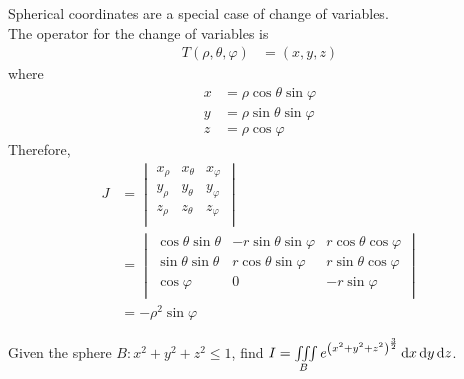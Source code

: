 \documentclass[fleqn, a4paper, 8pt, twoside]{amsart}
\theoremstyle{definition}
\theoremstyle{bluedefinition}
\theoremstyle{redtheorem}
\begin{document}
\begin{multicols}{2}
\begin{spacing}{0.7}
Spherical coordinates are a special case of change of variables.\\
The operator for the change of variables is
\begin{align*}
	T(\rho,\theta,\varphi) & = (x,y,z)
\end{align*}
where
\begin{align*}
	x & = \rho \cos \theta \sin \varphi \\
	y & = \rho \sin \theta \sin \varphi \\
	z & = \rho \cos \varphi
\end{align*}
Therefore,
\begin{align*}
	J &=
		\begin{vmatrix}
			x_{\rho} & x_{\theta} & x_{\varphi} \\
			y_{\rho} & y_{\theta} & y_{\varphi} \\
			z_{\rho} & z_{\theta} & z_{\varphi} \\
		\end{vmatrix}\\
	  &=
		\begin{vmatrix}
			\cos \theta \sin \theta & -r \sin \theta \sin \varphi & r \cos \theta \cos \varphi \\
			\sin \theta \sin \theta & r \cos \theta \sin \varphi  & r \sin \theta \cos \varphi \\
			\cos \varphi            & 0                           & -r \sin \varphi            \\
		\end{vmatrix}\\
	  &= -\rho^2 \sin \varphi
\end{align*}

\begin{question}
	Given the sphere $B : x^2 + y^2 + z^2 \le 1$, find $I = \iiint\limits_{B} e^{\left( x^2 + y^2 + z^2 \right)^{\frac{3}{2}}} \dif x \dif y \dif z$.
\end{question}


\end{spacing}
\end{multicols}
\end{document}
